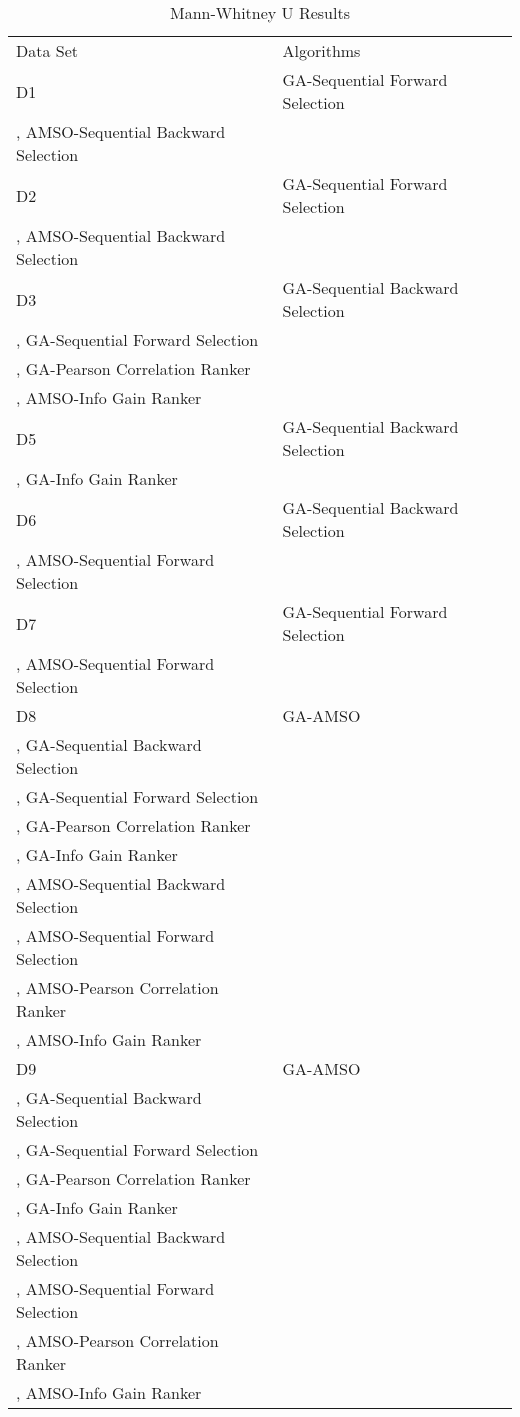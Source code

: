 \begin{table}
\caption{Mann-Whitney U Results}
\label{tbl:mann:whitney:u}
\begin{tabular}{ll}
\noalign{\smallskip}\hline\noalign{\smallskip}
Data Set & Algorithms \\
\noalign{\smallskip}\hline
D1&GA-Sequential Forward Selection\\
, AMSO-Sequential Backward Selection\\
D2&GA-Sequential Forward Selection\\
, AMSO-Sequential Backward Selection\\
D3&GA-Sequential Backward Selection\\
, GA-Sequential Forward Selection\\
, GA-Pearson Correlation Ranker\\
, AMSO-Info Gain Ranker\\
D5&GA-Sequential Backward Selection\\
, GA-Info Gain Ranker\\
D6&GA-Sequential Backward Selection\\
, AMSO-Sequential Forward Selection\\
D7&GA-Sequential Forward Selection\\
, AMSO-Sequential Forward Selection\\
D8&GA-AMSO\\
, GA-Sequential Backward Selection\\
, GA-Sequential Forward Selection\\
, GA-Pearson Correlation Ranker\\
, GA-Info Gain Ranker\\
, AMSO-Sequential Backward Selection\\
, AMSO-Sequential Forward Selection\\
, AMSO-Pearson Correlation Ranker\\
, AMSO-Info Gain Ranker\\
D9&GA-AMSO\\
, GA-Sequential Backward Selection\\
, GA-Sequential Forward Selection\\
, GA-Pearson Correlation Ranker\\
, GA-Info Gain Ranker\\
, AMSO-Sequential Backward Selection\\
, AMSO-Sequential Forward Selection\\
, AMSO-Pearson Correlation Ranker\\
, AMSO-Info Gain Ranker\\

\end{tabular}
\end{table}
